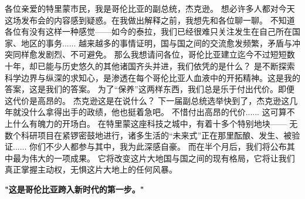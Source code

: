 \documentclass[openany]{book}
\begin{document}
\begin{dialogue}
     各位亲爱的特里蒙市民，我是哥伦比亚的副总统，杰克逊。
     想必许多人都对今天这场发布会的内容感到疑惑。在我做出解释之前，我想先和各位聊一聊。
     不知道各位有没有这样一种感觉——如今的泰拉，我们已经很难只关注发生在自己所在国家、地区的事务......
     越来越多的事情证明，国与国之间的交流愈发频繁，矛盾与冲突同样愈发剧烈、不可避免。
     那么我想请问各位，哥伦比亚建立迄今不过短短数十年，却已能与历史悠久的其他诸国齐头并进，我们依凭的是什么？
     是不断探索科学边界与纵深的求知心，是渗透在每个哥伦比亚人血液中的开拓精神。这是我的答案，这是我们的答案。
     为了“保养”这两样东西，我们总是乐于付出代价。即便这代价是高昂的。
     杰克逊这是在说什么？
     下一届副总统选举快到了，杰克逊这几年就没什么拿得出手的政绩，他也挺着急吧。
     不惜付出高昂的代价......
     这可算不上什么有魄力的开场白。
     在特里蒙这座科技之城中，有着十多个特别地块——
     无数个科研项目在紧锣密鼓地进行，诸多生活的“未来式”正在那里酝酿、发生、被验证......
     你们不少人都参与其中，我为此深感自豪。
     而在半个月后，我们将公布其中最为伟大的一项成果。
     它将改变这片大地国与国之间的现有格局，它将让我们真正掌握主动权，无惧这片大地上的任何风暴。
\end{dialogue}
\begin{center} \textbf{"这是哥伦比亚跨入新时代的第一步。"}\end{center}
\end{document}
